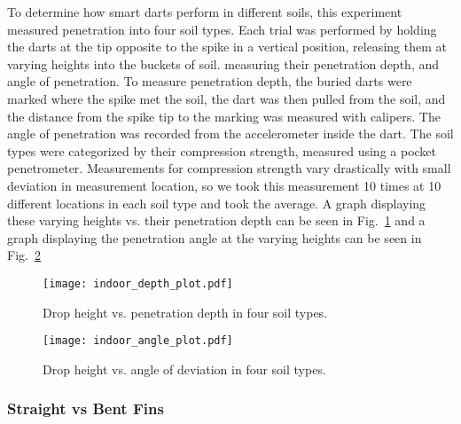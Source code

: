 To determine how smart darts perform in different soils, this experiment measured penetration into four soil types. 
 Each trial was performed by holding the darts at the tip opposite to the spike in a vertical position,  releasing them at varying heights into the buckets of soil.
  measuring their penetration depth, and angle of penetration. To measure penetration depth, the buried darts were marked where the spike met the soil, the dart was then pulled from the soil, and the distance from the spike tip to the marking was measured with calipers. The angle of penetration was recorded from the accelerometer inside the dart. The soil types were categorized by their compression strength, measured using a pocket penetrometer. Measurements for compression strength vary drastically with small deviation in measurement location, so we took this measurement 10 times at 10 different locations in each soil type and took the average. A graph displaying these varying heights vs. their penetration depth can be seen in Fig.~\ref{fig:DepthPlotIndoors} and a graph displaying the penetration angle at the varying heights can be seen in Fig.\ \ref{fig:AnglePlotIndoors}

\begin{figure} \centering
{\texttt{[image: indoor\_depth\_plot.pdf]}}
\caption{Drop height vs. penetration depth in four soil types.} 
\label{fig:DepthPlotIndoors}
\end{figure}

\begin{figure} \centering
{\texttt{[image: indoor\_angle\_plot.pdf]}}
\caption{Drop height vs. angle of deviation in four soil types.} 
\label{fig:AnglePlotIndoors}
\vspace{-1em}
\end{figure}

\subsubsection{Straight vs Bent Fins}


